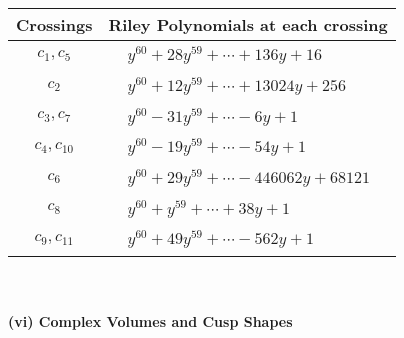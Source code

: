 \documentclass[1p]{elsarticle_modified}
\theoremstyle{definition}
\begin{document}
\begin{tabular}{m{50pt}|m{274pt}}
Crossings & \hspace{64pt}Riley Polynomials at each crossing \\
\hline $$\begin{aligned}c_{1},c_{5}\end{aligned}$$&$\begin{aligned}
&y^{60}+28 y^{59}+\cdots+136 y+16
\end{aligned}$\\
\hline $$\begin{aligned}c_{2}\end{aligned}$$&$\begin{aligned}
&y^{60}+12 y^{59}+\cdots+13024 y+256
\end{aligned}$\\
\hline $$\begin{aligned}c_{3},c_{7}\end{aligned}$$&$\begin{aligned}
&y^{60}-31 y^{59}+\cdots-6 y+1
\end{aligned}$\\
\hline $$\begin{aligned}c_{4},c_{10}\end{aligned}$$&$\begin{aligned}
&y^{60}-19 y^{59}+\cdots-54 y+1
\end{aligned}$\\
\hline $$\begin{aligned}c_{6}\end{aligned}$$&$\begin{aligned}
&y^{60}+29 y^{59}+\cdots-446062 y+68121
\end{aligned}$\\
\hline $$\begin{aligned}c_{8}\end{aligned}$$&$\begin{aligned}
&y^{60}+y^{59}+\cdots+38 y+1
\end{aligned}$\\
\hline $$\begin{aligned}c_{9},c_{11}\end{aligned}$$&$\begin{aligned}
&y^{60}+49 y^{59}+\cdots-562 y+1
\end{aligned}$\\
\hline
\end{tabular}\\~\\
\newpage\flushleft \textbf{(vi) Complex Volumes and Cusp Shapes}
\end{document}
